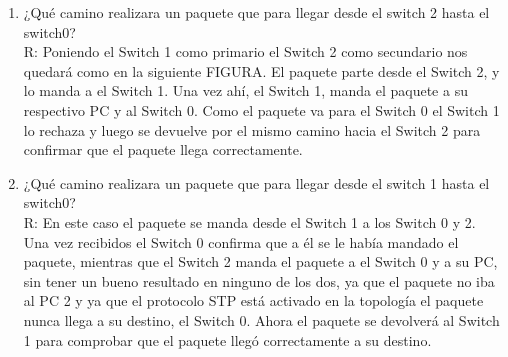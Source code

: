 \documentclass[onecolumn,11pts]{IEEEtran}
\begin{document}
\begin{enumerate}
    \item ¿Qué camino realizara un paquete que para llegar desde el switch 2 hasta el switch0?\\
R: Poniendo el Switch 1 como primario el Switch 2 como secundario nos quedará como en la siguiente FIGURA.
El paquete parte desde el Switch 2, y lo manda a el Switch 1. Una vez ahí, el Switch 1, manda el paquete a su respectivo PC y al Switch 0. Como el paquete va para el Switch 0 el Switch 1 lo rechaza y luego se devuelve por el mismo camino hacia el Switch 2 para confirmar que el paquete llega correctamente.\\
    \item ¿Qué camino realizara un paquete que para llegar desde el switch 1 hasta el switch0?\\
R: En este caso el paquete se manda desde el Switch 1 a los Switch 0 y 2. Una vez recibidos el Switch 0 confirma que a él se le había mandado el paquete, mientras que el Switch 2 manda el paquete a el Switch 0 y a su PC, sin tener un bueno resultado en ninguno de los dos, ya que el paquete no iba al PC 2 y ya que el protocolo STP está activado en la topología el paquete nunca llega a su destino, el Switch 0. Ahora el paquete se devolverá al Switch 1 para comprobar que el paquete llegó correctamente a su destino.

\end{enumerate}
\newpage
\end{document}
